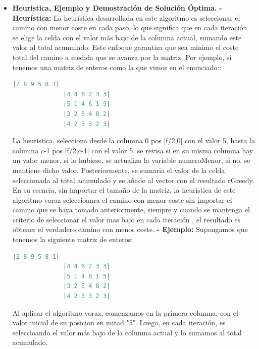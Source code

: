 \documentclass[12pt, letterpaper]{article}
\begin{document}
\begin{itemize}
\begin{lstlisting}[language=C++,basicstyle=\ttfamily\footnotesize]
            \end{lstlisting}

  \newpage %
        \item \textbf{Heuristica, Ejemplo y Demostración de Solución Óptima.}
          \subitem\textbf{- Heurística:}
            La heurística desarrollada en este algoritmo es seleccionar el camino con menor coste en cada paso, lo que significa que en cada iteración se elige la celda con el valor más bajo 
            de la columna actual, sumando este valor al total acumulado. Este enfoque garantiza que sea minimo el coste total del camino a medida que se avanza por la matriz.
            \newline
            Por ejemplo, si tenemos una matriz de enteros como la que vimos en el enunciado::
            \begin{lstlisting}[language=C++]
              |2 8 9 5 8 1|
              |4 4 6 2 3 3|
              |5 1 4 6 1 5|
              |3 2 5 4 8 2|
              |4 2 3 3 2 3|
            \end{lstlisting}
            La heurística, selecciona desde la columna 0 pos [f/2,0] con el valor 5, hasta la columna c-1 pos [f/2,c-1] con el valor 5, se revisa si en su misma columna hay un valor menor, 
            si lo hubiese, se actualiza la variable numeroMenor, si no, se mantiene dicho valor. Posteriormente, se sumaria el valor de la celda seleccionada al total acumulado y se añade al vector con el resultado rGreedy.
            \newline
            En su esencia, sin importar el tamaño de la matriz, la heuristica de este algoritmo voraz seleccioanra el camino con menor coste sin importar el camino que se haya tomado anteriormente, siempre y cuando se mantenga el criterio de seleccionar el valor mas bajo en cada iteración
            , el resultado es obtener el verdadero camino con menos coste.
  \newpage %
          \subitem\textbf{- Ejemplo:}
            Supongamos que tenemos la siguiente matriz de enteros:
            \begin{lstlisting}[language=C++]
              |2 8 9 5 8 1|
              |4 4 6 2 3 3|
              |5 1 4 6 1 5|
              |3 2 5 4 8 2|
              |4 2 3 3 2 3|
            \end{lstlisting}
            Al aplicar el algoritmo voraz, comenzamos en la primera columna, con el valor inicial de su posicion en mitad "5". 
            Luego, en cada iteración, es seleccioando el valor más bajo de la columna actual y lo sumamos al total acumulado. 

\end{itemize}
\end{document}
